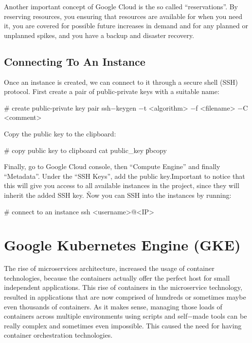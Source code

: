 Another important concept of Google Cloud is the so called ``reservations''. By reserving resources, you ensuring
that resources are available for when you need it, you are covered for possible future increases in demand and for any
planned or unplanned spikes, and you have a backup and disaster recovery.

\subsection{Connecting To An Instance}

Once an instance is created, we can connect to it through a secure shell (SSH) protocol. First create a pair of
public-private keys with a suitable name:
\begin{bash}
# create public-private key pair
ssh$-$keygen $-$t <algorithm> $-$f <filename> $-$C <comment>
\end{bash}

Copy the public key to the clipboard:
\begin{bash}
# copy public key to clipboard
cat \<public\_key\> \| pbcopy
\end{bash}

Finally, go to Google Cloud console, then ``Compute Engine'' and finally ``Metadata''. Under the ``SSH Keys'', add
the public key.Important to notice that this will give you access to all available instances in the project, since
they will inherit the added SSH key. \v

Now you can SSH into the instances by running:
\begin{bash}
# connect to an instance
ssh <username>@<IP>
\end{bash}

\section{Google Kubernetes Engine (GKE)}

The rise of microservices architecture, increased the usage of container technologies, because the containers
actually offer the perfect host for small independent applications. This rise of containers in the microservice
technology, resulted in applications that are now comprised of hundreds or sometimes maybe even thousands of
containers. As it makes sense, managing those loads of containers across multiple environments using scripts and
self$-$made tools can be really complex and sometimes even impossible. This caused the need for having container
orchestration technologies.

